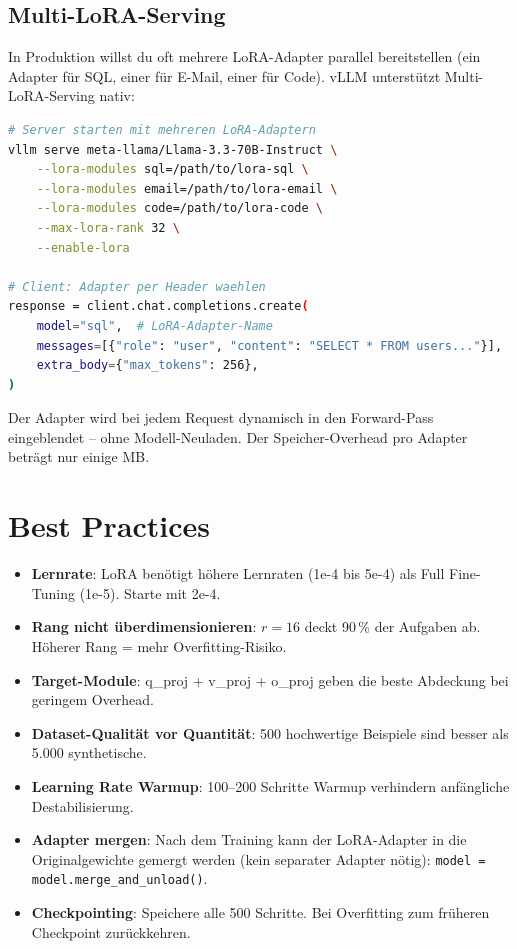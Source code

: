 \subsection{Multi-LoRA-Serving}

In Produktion willst du oft mehrere LoRA-Adapter parallel bereitstellen (ein Adapter für SQL, einer für E-Mail, einer für Code). vLLM unterstützt Multi-LoRA-Serving nativ:

\begin{lstlisting}[language=bash, caption=Multi-LoRA-Serving mit vLLM]
# Server starten mit mehreren LoRA-Adaptern
vllm serve meta-llama/Llama-3.3-70B-Instruct \
    --lora-modules sql=/path/to/lora-sql \
    --lora-modules email=/path/to/lora-email \
    --lora-modules code=/path/to/lora-code \
    --max-lora-rank 32 \
    --enable-lora

# Client: Adapter per Header waehlen
response = client.chat.completions.create(
    model="sql",  # LoRA-Adapter-Name
    messages=[{"role": "user", "content": "SELECT * FROM users..."}],
    extra_body={"max_tokens": 256},
)
\end{lstlisting}

Der Adapter wird bei jedem Request dynamisch in den Forward-Pass eingeblendet -- ohne Modell-Neuladen. Der Speicher-Overhead pro Adapter beträgt nur einige MB.


\section{Best Practices}

\begin{itemize}[leftmargin=*]
    \item \textbf{Lernrate}: LoRA benötigt höhere Lernraten (1e-4 bis 5e-4) als Full Fine-Tuning (1e-5). Starte mit 2e-4.
    \item \textbf{Rang nicht überdimensionieren}: $r=16$ deckt 90\,\% der Aufgaben ab. Höherer Rang = mehr Overfitting-Risiko.
    \item \textbf{Target-Module}: q\_proj + v\_proj + o\_proj geben die beste Abdeckung bei geringem Overhead.
    \item \textbf{Dataset-Qualität vor Quantität}: 500 hochwertige Beispiele sind besser als 5.000 synthetische.
    \item \textbf{Learning Rate Warmup}: 100--200 Schritte Warmup verhindern anfängliche Destabilisierung.
    \item \textbf{Adapter mergen}: Nach dem Training kann der LoRA-Adapter in die Originalgewichte gemergt werden (kein separater Adapter nötig): \texttt{model = model.merge\_and\_unload()}.
    \item \textbf{Checkpointing}: Speichere alle 500 Schritte. Bei Overfitting zum früheren Checkpoint zurückkehren.
\end{itemize}

